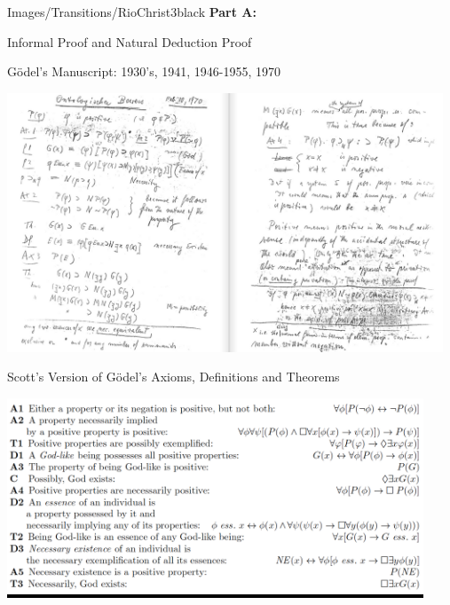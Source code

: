 \begin{transitionframe}{Images/Transitions/RioChrist3}{black}
\textbf{Part A:}

Informal Proof and Natural Deduction Proof
\end{transitionframe}




\begin{frame}{G\"odel's Manuscript: 1930's, 1941, 1946-1955, 1970}
\bigskip

\begin{changemargin}{-1.2cm}{-1.2cm}
\includegraphics[width=13cm]{Images/Manuscript.png}
\end{changemargin}
\end{frame}

\begin{frame}{Scott's Version of G\"odel's Axioms, Definitions and Theorems}
\begin{changemargin}{-0.9cm}{-0.8cm}
\colorbox{black}{\includegraphics[width=12.4cm]{Images/ScottsScriptGrab.png}}
\end{changemargin}
\end{frame}




